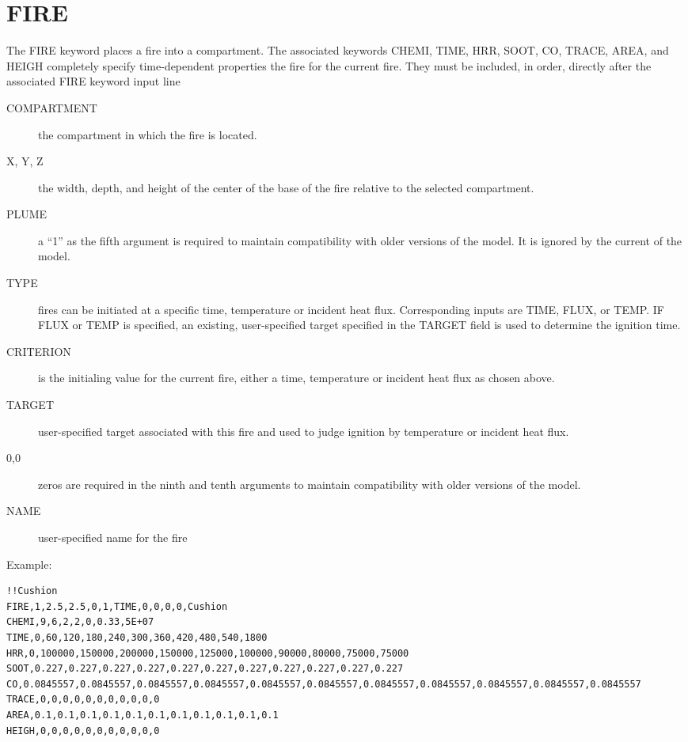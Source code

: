 \section{FIRE}

The FIRE keyword places a fire into a compartment. The associated keywords CHEMI, TIME, HRR, SOOT, CO, TRACE, AREA, and HEIGH completely specify time-dependent properties the fire for the current fire. They must be included, in order, directly after the associated FIRE keyword input line

\begin{adjustwidth}{1cm}{0cm}
\begin{description}
  \item[COMPARTMENT] the compartment in which the fire is located.
  \item[X, Y, Z] the width, depth, and height of the center of the base of the fire relative to the selected compartment.
  \item [PLUME] a ``1'' as the fifth argument is required to maintain compatibility with older versions of the model. It is ignored by the current of the model.
  \item[TYPE] fires can be initiated at a specific time, temperature or incident heat flux. Corresponding inputs are TIME, FLUX, or TEMP.  IF FLUX or TEMP is specified, an existing, user-specified target specified in the TARGET field is used to determine the ignition time.
  \item[CRITERION] is the initialing value for the current fire, either a time, temperature or incident heat flux as chosen above.
  \item[TARGET] user-specified target associated with this fire and used to judge ignition by temperature or incident heat flux.
  \item[0,0] zeros are required in the ninth and tenth arguments to maintain compatibility with older versions of the model.
  \item[NAME] user-specified name for the fire
\end{description}
\end{adjustwidth}

\noindent Example:

\begin{lstlisting}
!!Cushion
FIRE,1,2.5,2.5,0,1,TIME,0,0,0,0,Cushion
CHEMI,9,6,2,2,0,0.33,5E+07
TIME,0,60,120,180,240,300,360,420,480,540,1800
HRR,0,100000,150000,200000,150000,125000,100000,90000,80000,75000,75000
SOOT,0.227,0.227,0.227,0.227,0.227,0.227,0.227,0.227,0.227,0.227,0.227
CO,0.0845557,0.0845557,0.0845557,0.0845557,0.0845557,0.0845557,0.0845557,0.0845557,0.0845557,0.0845557,0.0845557
TRACE,0,0,0,0,0,0,0,0,0,0,0
AREA,0.1,0.1,0.1,0.1,0.1,0.1,0.1,0.1,0.1,0.1,0.1
HEIGH,0,0,0,0,0,0,0,0,0,0,0
\end{lstlisting}

